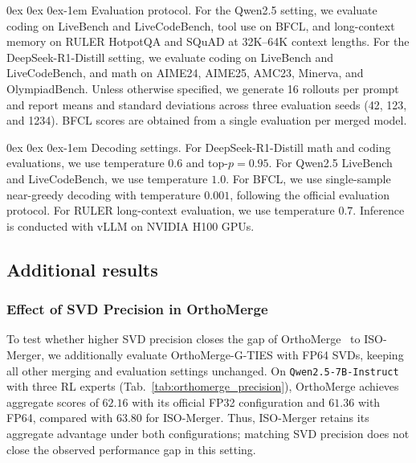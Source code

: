 \documentclass[11pt, a4paper]{utda}
\makeatletter
\renewcommand{\paragraph}{%
  \@startsection{paragraph}{4}%
  {\z@}{0ex \@plus 0ex \@minus 0ex}{-1em}%
  {\normalfont\normalsize\bfseries}%
}
\theoremstyle{plain}
\theoremstyle{definition}
\theoremstyle{remark}
\makeatother
\begin{document}
\paragraph{Evaluation protocol.}
For the Qwen2.5 setting, we evaluate coding on LiveBench and LiveCodeBench,
tool use on BFCL, and long-context memory on RULER HotpotQA and SQuAD at
32K--64K context lengths. For the DeepSeek-R1-Distill setting, we evaluate
coding on LiveBench and LiveCodeBench, and math on AIME24, AIME25, AMC23,
Minerva, and OlympiadBench. Unless otherwise specified, we generate 16 rollouts
per prompt and report means and standard deviations across three evaluation seeds (42, 123, and 1234).
BFCL scores are obtained from a single evaluation per merged model.

\paragraph{Decoding settings.}
For DeepSeek-R1-Distill math and coding evaluations, we use temperature $0.6$
and top-$p=0.95$. For Qwen2.5 LiveBench and LiveCodeBench, we use temperature
$1.0$. 
For BFCL, we use single-sample near-greedy decoding with temperature
$0.001$, following the official evaluation protocol.
For RULER
long-context evaluation, we use temperature $0.7$. Inference is conducted with
vLLM on NVIDIA H100 GPUs.

\subsection{Additional results}

\subsubsection{Effect of SVD Precision in OrthoMerge}
\label{app:orthomerge_precision}
To test whether higher SVD precision closes the gap of OrthoMerge~\cite{yang2026orthogonal} to ISO-Merger,
we additionally evaluate OrthoMerge-G-TIES with FP64 SVDs,
keeping all other merging and evaluation settings unchanged.
On \texttt{Qwen2.5-7B-Instruct} with three RL experts
(Tab.~\ref{tab:orthomerge_precision}), OrthoMerge achieves
aggregate scores of $62.16$ with its official FP32 configuration
and $61.36$ with FP64, compared with $63.80$ for ISO-Merger.
Thus, ISO-Merger retains its aggregate advantage under both
configurations; matching SVD precision does not close the
observed performance gap in this setting.
\end{document}
